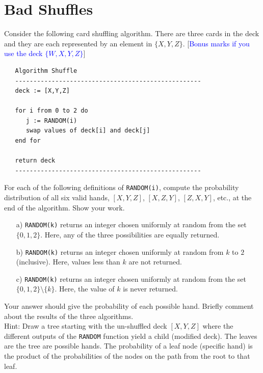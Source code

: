 \documentclass[12pt, letterpaper]{article}
\begin{document}
\clearpage
\section{Bad Shuffles}
 
Consider the following card shuffling algorithm.  There are three cards in the deck and they are each represented by an element in $\{X,Y,Z\}$.  [\textcolor{blue}{Bonus marks if you use the deck $\{W,X,Y,Z\}$}] 

{\small
\begin{Verbatim}
   Algorithm Shuffle
   ---------------------------------------------------
   deck := [X,Y,Z]

   for i from 0 to 2 do
      j := RANDOM(i)
      swap values of deck[i] and deck[j]
   end for

   return deck
   ---------------------------------------------------
\end{Verbatim}
}

For each of the following definitions of \texttt{RANDOM(i)}, 
compute the probability distribution of all six valid hands, $[X,Y,Z]$, $[X,Z,Y]$, $[Z,X,Y]$, etc., at the end of the algorithm. Show your work. 

\begin{itemize}
\item[a)] \texttt{RANDOM(k)} returns an integer chosen uniformly at random from the set $\{0,1,2\}$.  Here, any of the three possibilities are equally returned.

\item[b)] \texttt{RANDOM(k)} returns an integer chosen uniformly at random from $k$ to $2$ (inclusive).  Here, values less than $k$ are not returned.

\item[c)] \texttt{RANDOM(k)} returns an integer chosen uniformly at random from the 
set $\{0,1,2\} \setminus \{k\}$. Here, the value of $k$ is never returned.
\end{itemize}
Your answer should give the probability of each possible hand.
Briefly comment about the results of the three algorithms. \\

Hint: Draw a tree starting with the un-shuffled deck $[X,Y,Z]$ where 
the different outputs of the \texttt{RANDOM} function yield a child (modified deck). The leaves are the tree are possible hands. The probability of a leaf node (specific hand) is the product of the probabilities of the nodes on the path from the root to that leaf.
\end{document}
